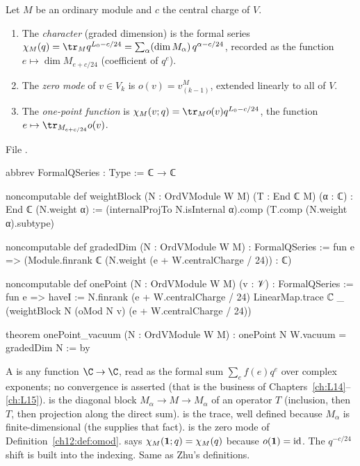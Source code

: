 \begin{definition}\label{l12:def:char}
Let $M$ be an ordinary module and $c$ the central charge of $V$.
\begin{enumerate}
\item The \emph{character} (graded dimension) is the formal series
  $\chi_M(q) = \tr_M q^{L_0-c/24} = \sum_\alpha(\dim M_\alpha)\,q^{\alpha-c/24}$, recorded as the function
  $e\mapsto\dim M_{e+c/24}$ (coefficient of $q^e$).
\item The \emph{zero mode} of $v\in V_k$ is $o(v) = v^M_{(k-1)}$, extended linearly to all of $V$.
\item The \emph{one-point function} is $\chi_M(v;q) = \tr_M o(v)q^{L_0-c/24}$, the function
  $e\mapsto\tr_{M_{e+c/24}}o(v)$.
\end{enumerate}
\end{definition}
\noindent File .
\begin{leancode}
abbrev FormalQSeries : Type := ℂ → ℂ

noncomputable def weightBlock (N : OrdVModule W M) (T : End ℂ M) (α : ℂ) : End ℂ (N.weight α) :=
  (internalProjTo N.isInternal α).comp (T.comp (N.weight α).subtype)

noncomputable def gradedDim (N : OrdVModule W M) : FormalQSeries :=
  fun e => (Module.finrank ℂ (N.weight (e + W.centralCharge / 24)) : ℂ)

noncomputable def onePoint (N : OrdVModule W M) (v : 𝒱) : FormalQSeries :=
  fun e =>
    haveI := N.finrank (e + W.centralCharge / 24)
    LinearMap.trace ℂ _ (weightBlock N (oMod N v) (e + W.centralCharge / 24))

theorem onePoint_vacuum (N : OrdVModule W M) : onePoint N W.vacuum = gradedDim N := by
\end{leancode}

\begin{dictionary}
A  is any function $\C\to\C$, read as the formal sum $\sum_e f(e)q^e$ over complex
exponents; no convergence is asserted (that is the business of Chapters~\ref{ch:L14}--\ref{ch:L15}).
 is the diagonal block $M_\alpha\to M\to M_\alpha$ of an operator $T$ (inclusion,
then $T$, then projection along the direct sum).  is the trace, well defined because
$M_\alpha$ is finite-dimensional (the  supplies that fact).  is the zero mode of
Definition~\ref{ch12:def:omod}.  says $\chi_M(\mathbf{1};q) = \chi_M(q)$
because $o(\mathbf{1}) = \mathrm{id}$. The $q^{-c/24}$ shift is built into the indexing. Same as Zhu's
definitions.
\end{dictionary}

